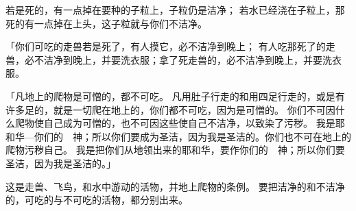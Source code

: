 {若是死的，有一点掉在要种的子粒上，子粒仍是洁净；
若水已经浇在子粒上，那死的有一点掉在上头，这子粒就与你们不洁净。
\par }{\PP {}「你们可吃的走兽若是死了，有人摸它，必不洁净到晚上；
有人吃那死了的走兽，必不洁净到晚上，并要洗衣服；拿了死走兽的，必不洁净到晚上，并要洗衣服。
\par }{\PP {}「凡地上的爬物是可憎的，都不可吃。
凡用肚子行走的和用四足行走的，或是有许多足的，就是一切爬在地上的，你们都不可吃，因为是可憎的。
你们不可因什么爬物使自己成为可憎的，也不可因这些使自己不洁净，以致染了污秽。
我是耶和华—你们的　神；所以你们要成为圣洁，因为我是圣洁的。你们也不可在地上的爬物污秽自己。
我是把你们从{}地领出来的耶和华，要作你们的　神；所以你们要圣洁，因为我是圣洁的。」
\par }{\PP {}这是走兽、飞鸟，和水中游动的活物，并地上爬物的条例。
要把洁净的和不洁净的，可吃的与不可吃的活物，都分别出来。

\par }
